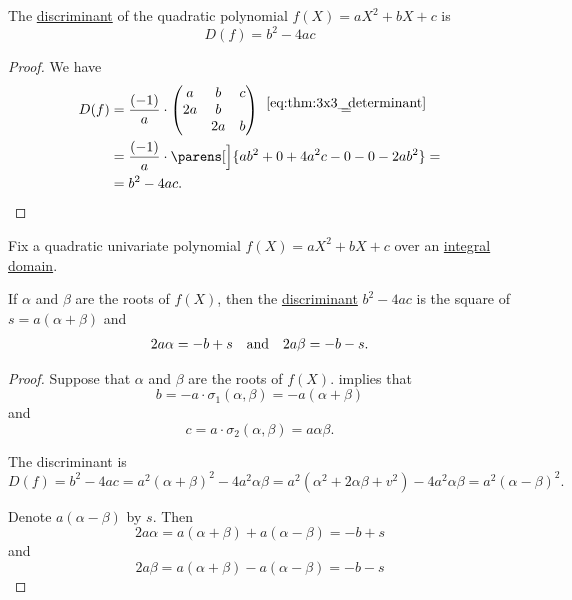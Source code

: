 \begin{lemma}\label{thm:quadratic_polynomial_discriminant}
  The \hyperref[def:discriminant]{discriminant} of the quadratic polynomial \( f(X) = a X^2 + b X + c \) is
  \begin{equation}\label{eq:thm:quadratic_polynomial_discriminant}
    D(f) = b^2 - 4ac
  \end{equation}
\end{lemma}
\begin{proof}
  We have
  \begin{align*}
    D(f)
    &=
    \frac {(-1)} a \cdot \begin{pmatrix}
      a  & b  & c  \\
      2a & b  &    \\
         & 2a & b
    \end{pmatrix}
    \reloset {\eqref{eq:thm:3x3_determinant}} = \\ &=
    \frac {(-1)} a \cdot \parens[\Big]{ ab^2 + 0 + 4a^2c - 0 - 0 - 2ab^2 }
    = \\ &=
    b^2 - 4ac.
  \end{align*}
\end{proof}

\begin{proposition}\label{thm:quadratic_polynomial_roots}
  Fix a quadratic univariate polynomial \( f(X) = a X^2 + b X + c \) over an \hyperref[def:integral_domain]{integral domain}.

  If \( \alpha \) and \( \beta \) are the roots of \( f(X) \), then the \hyperref[def:discriminant]{discriminant} \( b^2 - 4ac \) is the square of \( s = a(\alpha + \beta) \) and
  \begin{align*}
    2a\alpha = -b + s
    &&\T{and}&&
    2a\beta = -b - s.
  \end{align*}
\end{proposition}
\begin{proof}
  Suppose that \( \alpha \) and \( \beta \) are the roots of \( f(X) \).  implies that
  \begin{equation*}
    b =  -a \cdot \sigma_1(\alpha, \beta) = -a(\alpha + \beta)
  \end{equation*}
  and
  \begin{equation*}
    c = a \cdot \sigma_2(\alpha, \beta) = a\alpha\beta.
  \end{equation*}

  The discriminant is
  \begin{equation*}
    D(f) = b^2 - 4ac = a^2(\alpha + \beta)^2 - 4a^2 \alpha\beta = a^2 (\alpha^2 + 2\alpha\beta + v^2) - 4a^2 \alpha\beta = a^2 (\alpha - \beta)^2.
  \end{equation*}

  Denote \( a(\alpha - \beta) \) by \( s \). Then
  \begin{equation*}
    2a\alpha = a(\alpha + \beta) + a(\alpha - \beta) = -b + s
  \end{equation*}
  and
  \begin{equation*}
    2a\beta = a(\alpha + \beta) - a(\alpha - \beta) = -b - s
  \end{equation*}
\end{proof}

